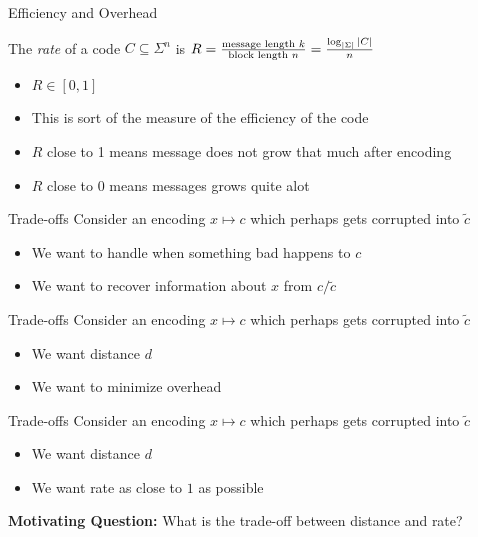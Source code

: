 \documentclass[aspectratio=169]{beamer}
\begin{document}
\begin{frame}{Efficiency and Overhead}
    \begin{defn}[Rate]
        The \emph{rate} of a code $C \subseteq \Sigma^n$ is $R = \frac{\text{message length }k}{\text{block length }n} = \frac{\log_\abs{\Sigma}\abs{C}}{n}$
    \end{defn}\pause
    \begin{itemize}
        \item $R \in [0, 1]$
        \item This is sort of the measure of the efficiency of the code \pause
        \item $R$ close to 1 means message does not grow that much after encoding
        \item $R$ close to 0 means messages grows quite alot
    \end{itemize}
\end{frame}

\begin{frame}{Trade-offs}
    Consider an encoding $x \mapsto c$ which perhaps gets corrupted into $\tilde{c}$
    \begin{itemize}
        \item We want to handle when something bad happens to $c$
        \item We want to recover information about $x$ from $c / \tilde{c}$ 
    \end{itemize}
\end{frame}

\begin{frame}{Trade-offs}
    Consider an encoding $x \mapsto c$ which perhaps gets corrupted into $\tilde{c}$
    \begin{itemize}
        \item We want \textcolor{sigma@mainblue}{distance $d$} \pause
        \item We want to minimize overhead
    \end{itemize}
\end{frame}

\begin{frame}{Trade-offs}
    Consider an encoding $x \mapsto c$ which perhaps gets corrupted into $\tilde{c}$
    \begin{itemize}
        \item We want \textcolor{sigma@mainblue}{distance $d$} 
        \item We want \textcolor{sigma@mainblue}{rate as close to $1$ as possible}
    \end{itemize}

    \textcolor{sigma@mainblue}{\textbf{Motivating Question:}} What is the trade-off between distance and rate? 
\end{frame}
\end{document}
